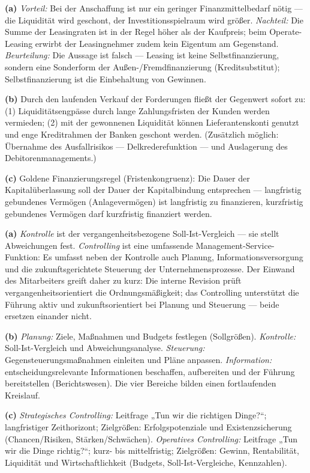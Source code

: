 \documentclass[11pt, a4paper]{article}
\begin{document}
\begin{loesung}[title={Lösung Aufgabe~6 --- Leasing, Factoring \& goldene Finanzierungsregel}]
\textbf{(a)} \emph{Vorteil:} Bei der Anschaffung ist nur ein geringer Finanzmittelbedarf
nötig --- die Liquidität wird geschont, der Investitionsspielraum wird größer.
\emph{Nachteil:} Die Summe der Leasingraten ist in der Regel höher als der Kaufpreis;
beim Operate-Leasing erwirbt der Leasingnehmer zudem kein Eigentum am Gegenstand.
\emph{Beurteilung:} Die Aussage ist falsch --- Leasing ist keine Selbstfinanzierung,
sondern eine Sonderform der Außen-/Fremdfinanzierung (Kreditsubstitut); Selbstfinanzierung
ist die Einbehaltung von Gewinnen.

\textbf{(b)} Durch den laufenden Verkauf der Forderungen fließt der Gegenwert sofort zu:
(1) Liquiditätsengpässe durch lange Zahlungsfristen der Kunden werden vermieden;
(2) mit der gewonnenen Liquidität können Lieferantenskonti genutzt und enge Kreditrahmen
der Banken geschont werden. (Zusätzlich möglich: Übernahme des Ausfallrisikos
--- Delkrederefunktion --- und Auslagerung des Debitorenmanagements.)

\textbf{(c)} Goldene Finanzierungsregel (Fristenkongruenz): Die Dauer der
Kapitalüberlassung soll der Dauer der Kapitalbindung entsprechen --- langfristig
gebundenes Vermögen (Anlagevermögen) ist langfristig zu finanzieren, kurzfristig
gebundenes Vermögen darf kurzfristig finanziert werden.
\end{loesung}

\begin{loesung}[title={Lösung Aufgabe~7 --- Controlling}]
\textbf{(a)} \emph{Kontrolle} ist der vergangenheitsbezogene Soll-Ist-Vergleich ---
sie stellt Abweichungen fest. \emph{Controlling} ist eine umfassende
Management-Service-Funktion: Es umfasst neben der Kontrolle auch Planung,
Informationsversorgung und die zukunftsgerichtete Steuerung der Unternehmensprozesse.
Der Einwand des Mitarbeiters greift daher zu kurz: Die interne Revision prüft
vergangenheitsorientiert die Ordnungsmäßigkeit; das Controlling unterstützt die Führung
aktiv und zukunftsorientiert bei Planung und Steuerung --- beide ersetzen einander nicht.

\textbf{(b)} \emph{Planung:} Ziele, Maßnahmen und Budgets festlegen (Sollgrößen).
\emph{Kontrolle:} Soll-Ist-Vergleich und Abweichungsanalyse.
\emph{Steuerung:} Gegensteuerungsmaßnahmen einleiten und Pläne anpassen.
\emph{Information:} entscheidungsrelevante Informationen beschaffen, aufbereiten und der
Führung bereitstellen (Berichtswesen). Die vier Bereiche bilden einen fortlaufenden
Kreislauf.

\textbf{(c)} \emph{Strategisches Controlling:} Leitfrage „Tun wir die richtigen
Dinge?``; langfristiger Zeithorizont; Zielgrößen: Erfolgspotenziale und
Existenzsicherung (Chancen/Risiken, Stärken/Schwächen).
\emph{Operatives Controlling:} Leitfrage „Tun wir die Dinge richtig?``; kurz- bis
mittelfristig; Zielgrößen: Gewinn, Rentabilität, Liquidität und Wirtschaftlichkeit
(Budgets, Soll-Ist-Vergleiche, Kennzahlen).
\end{loesung}
\end{document}
